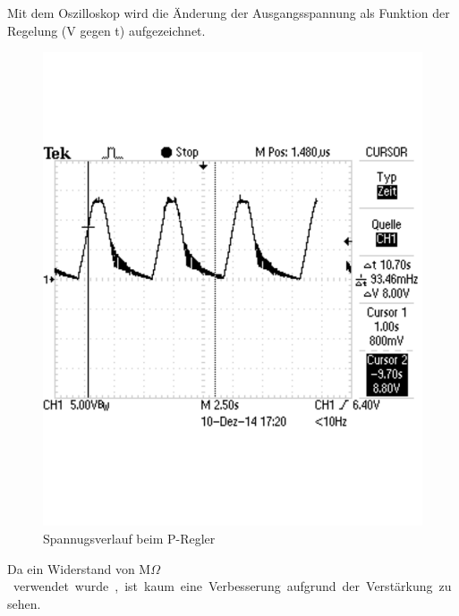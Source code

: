 \documentclass[12pt,a4paper]{article}
\begin{document}
Mit dem Oszilloskop wird die Änderung der Ausgangsspannung als Funktion der Regelung (V gegen t) aufgezeichnet.
\begin{figure}[H]
  \centering
    \includegraphics[trim = 0mm 50mm 0mm 50mm, clip, scale = 0.6]{TEK0004.pdf}
  	\caption[Spannugsverlauf beim P-Regler]{Spannugsverlauf beim P-Regler}
  \label{fig:P-Regler_Oszi_3_3_1}
\end{figure}
Da ein Widerstand von \unit[1]{M$\Omega$} verwendet wurde, ist kaum eine Verbesserung aufgrund der Verstärkung zu sehen.
\end{document}
